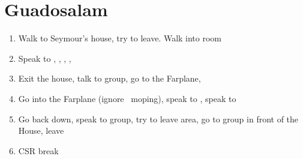 \chapter{Guadosalam}

\begin{enumerate}
    \item Walk to Seymour's house, try to leave. Walk into room
    \item Speak to \lulu, \wakka, \auron, \rikku, \yuna
    \item Exit the house, talk to group, go to the Farplane, 
    \item Go into the Farplane (ignore \auron\ moping), speak to \wakka, speak to \yuna
    \item Go back down, speak to group, try to leave area, go to group in front of the House, leave
    \wincb\losscb\bothcb
    \item CSR break
\end{enumerate}
